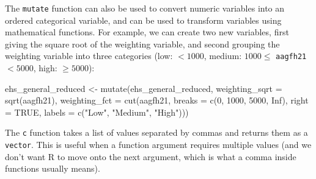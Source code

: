\documentclass[
  letterpaper,
  DIV=11,
  numbers=noendperiod]{scrreprt}
\newenvironment{Shaded}{\begin{snugshade}}{\end{snugshade}}
\newcommand{\AttributeTok}[1]{\textcolor[rgb]{0.40,0.45,0.13}{#1}}
\newcommand{\ConstantTok}[1]{\textcolor[rgb]{0.56,0.35,0.01}{#1}}
\newcommand{\DecValTok}[1]{\textcolor[rgb]{0.68,0.00,0.00}{#1}}
\newcommand{\FunctionTok}[1]{\textcolor[rgb]{0.28,0.35,0.67}{#1}}
\newcommand{\NormalTok}[1]{\textcolor[rgb]{0.00,0.23,0.31}{#1}}
\newcommand{\OtherTok}[1]{\textcolor[rgb]{0.00,0.23,0.31}{#1}}
\newcommand{\StringTok}[1]{\textcolor[rgb]{0.13,0.47,0.30}{#1}}
\begin{document}
The \texttt{mutate} function can also be used to convert numeric
variables into an ordered categorical variable, and can be used to
transform variables using mathematical functions. For example, we can
create two new variables, first giving the square root of the weighting
variable, and second grouping the weighting variable into three
categories (low: \(< 1000\), medium: \(1000 \leq\) \texttt{aagfh21}
\(< 5000\), high: \(\geq 5000\)):

\begin{Shaded}
\begin{Highlighting}[]
\NormalTok{ehs\_general\_reduced }\OtherTok{\textless{}{-}} \FunctionTok{mutate}\NormalTok{(ehs\_general\_reduced,}
                              \AttributeTok{weighting\_sqrt =} \FunctionTok{sqrt}\NormalTok{(aagfh21),}
                              \AttributeTok{weighting\_fct =} \FunctionTok{cut}\NormalTok{(aagfh21, }
                                                  \AttributeTok{breaks =} \FunctionTok{c}\NormalTok{(}\DecValTok{0}\NormalTok{, }\DecValTok{1000}\NormalTok{, }\DecValTok{5000}\NormalTok{, }\ConstantTok{Inf}\NormalTok{),}
                                                  \AttributeTok{right =} \ConstantTok{TRUE}\NormalTok{,}
                                                  \AttributeTok{labels =} \FunctionTok{c}\NormalTok{(}\StringTok{"Low"}\NormalTok{, }\StringTok{"Medium"}\NormalTok{,}
                                                              \StringTok{"High"}\NormalTok{)))}
\end{Highlighting}
\end{Shaded}

\begin{tcolorbox}[enhanced jigsaw, bottomrule=.15mm, left=2mm, leftrule=.75mm, bottomtitle=1mm, coltitle=black, colbacktitle=quarto-callout-note-color!10!white, toptitle=1mm, arc=.35mm, breakable, title=\textcolor{quarto-callout-note-color}{\faInfo}\hspace{0.5em}{Helpful hint}, rightrule=.15mm, toprule=.15mm, opacityback=0, opacitybacktitle=0.6, titlerule=0mm, colback=white, colframe=quarto-callout-note-color-frame]

The \texttt{c} function takes a list of values separated by commas and
returns them as a \texttt{vector}. This is useful when a function
argument requires multiple values (and we don't want R to move onto the
next argument, which is what a comma inside functions usually means).

\end{tcolorbox}
\end{document}

